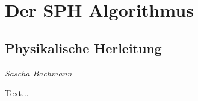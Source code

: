 \chapter{Der SPH Algorithmus}
\thispagestyle{empty}

\section{Physikalische Herleitung}

\begin{center}
\emph{{\small Sascha Bachmann}}
\end{center}

\bigskip

Text...

